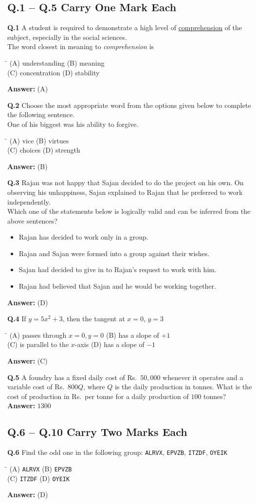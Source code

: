 \documentclass[11pt,a4paper]{article}
\newcommand{\optsfourA}[4]{%
  \begin{tabbing}
    \hspace{0.48\linewidth}\=\kill
    (A) #1 \> (B) #2 \\[2pt]
    (C) #3 \> (D) #4
  \end{tabbing}%
}
\newcommand{\optslistA}[4]{%
  \begin{itemize}
    \setlength{\itemsep}{2pt}\setlength{\parskip}{0pt}
    \item[(A)] #1
    \item[(B)] #2
    \item[(C)] #3
    \item[(D)] #4
  \end{itemize}%
}
\newcommand{\ans}[1]{\textbf{Answer:} #1\par\medskip}
\begin{document}
\subsection*{Q.1 -- Q.5 Carry One Mark Each}

\textbf{Q.1} A student is required to demonstrate a high level of \underline{comprehension} of the subject, especially in the social sciences.\\
The word closest in meaning to \textit{comprehension} is
\optsfourA{understanding}{meaning}{concentration}{stability}
\ans{(A)}

\textbf{Q.2} Choose the most appropriate word from the options given below to complete the following sentence.\\
One of his biggest \underline{\hspace{2cm}} was his ability to forgive.
\optsfourA{vice}{virtues}{choices}{strength}
\ans{(B)}

\textbf{Q.3} Rajan was not happy that Sajan decided to do the project on his own. On observing his unhappiness, Sajan explained to Rajan that he preferred to work independently.\\
Which one of the statements below is logically valid and can be inferred from the above sentences?
\optslistA{Rajan has decided to work only in a group.}{Rajan and Sajan were formed into a group against their wishes.}{Sajan had decided to give in to Rajan's request to work with him.}{Rajan had believed that Sajan and he would be working together.}
\ans{(D)}

\textbf{Q.4} If $y = 5x^2 + 3$, then the tangent at $x = 0$, $y = 3$
\optsfourA{passes through $x = 0, y = 0$}{has a slope of $+1$}{is parallel to the $x$-axis}{has a slope of $-1$}
\ans{(C)}

\textbf{Q.5} A foundry has a fixed daily cost of Rs.\ $50,000$ whenever it operates and a variable cost of Rs.\ $800Q$, where $Q$ is the daily production in tonnes. What is the cost of production in Rs.\ per tonne for a daily production of $100$ tonnes? \underline{\hspace{2cm}}
\ans{$1300$}

\subsection*{Q.6 -- Q.10 Carry Two Marks Each}

\textbf{Q.6} Find the odd one in the following group: \texttt{ALRVX}, \texttt{EPVZB}, \texttt{ITZDF}, \texttt{OYEIK}
\optsfourA{\texttt{ALRVX}}{\texttt{EPVZB}}{\texttt{ITZDF}}{\texttt{OYEIK}}
\ans{(D)}
\end{document}
